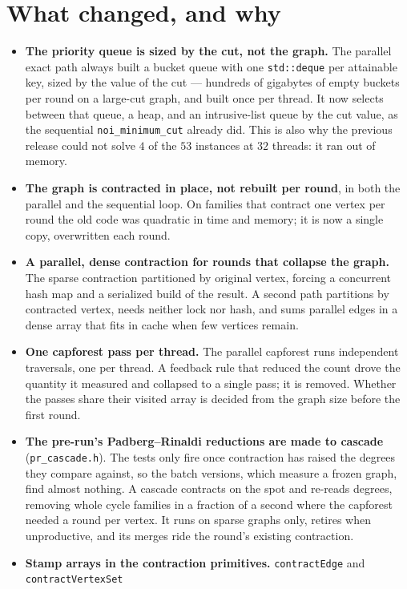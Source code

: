 \documentclass[10pt]{article}
\newcommand{\cfg}[1]{\texttt{#1}}
\begin{document}
\section{What changed, and why}
\begin{itemize}
  \item \textbf{The priority queue is sized by the cut, not the graph.} The parallel exact path always built a
  bucket queue with one \cfg{std::deque} per attainable key, sized by the value of the cut --- hundreds of
  gigabytes of empty buckets per round on a large-cut graph, and built once per thread. It now selects between
  that queue, a heap, and an intrusive-list queue by the cut value, as the sequential \cfg{noi\_minimum\_cut}
  already did. This is also why the previous release could not solve $4$ of the $53$ instances at $32$ threads:
  it ran out of memory.
  \item \textbf{The graph is contracted in place, not rebuilt per round}, in both the parallel and the sequential
  loop. On families that contract one vertex per round the old code was quadratic in time and memory; it is now a
  single copy, overwritten each round.
  \item \textbf{A parallel, dense contraction for rounds that collapse the graph.} The sparse contraction
  partitioned by original vertex, forcing a concurrent hash map and a serialized build of the result. A second
  path partitions by contracted vertex, needs neither lock nor hash, and sums parallel edges in a dense array
  that fits in cache when few vertices remain.
  \item \textbf{One capforest pass per thread.} The parallel capforest runs independent traversals, one per
  thread. A feedback rule that reduced the count drove the quantity it measured and collapsed to a single pass;
  it is removed. Whether the passes share their visited array is decided from the graph size before the first
  round.
  \item \textbf{The pre-run's Padberg--Rinaldi reductions are made to cascade} (\cfg{pr\_cascade.h}). The tests
  only fire once contraction has raised the degrees they compare against, so the batch versions, which measure a
  frozen graph, find almost nothing. A cascade contracts on the spot and re-reads degrees, removing whole cycle
  families in a fraction of a second where the capforest needed a round per vertex. It runs on sparse graphs
  only, retires when unproductive, and its merges ride the round's existing contraction.
  \item \textbf{Stamp arrays in the contraction primitives.} \cfg{contractEdge} and \cfg{contractVertexSet}

\end{itemize}
\end{document}
